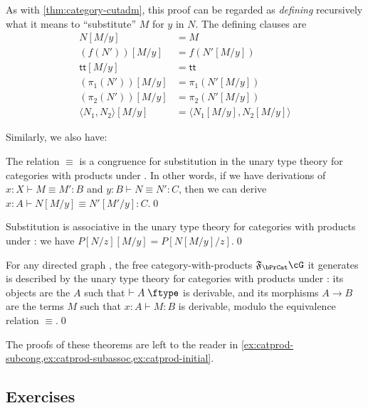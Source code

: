\documentclass{book}
\let\types\vdash
\def\type{\;\ftype}
\newcommand{\F}[1]{\mathfrak{F}_{#1}}
\def\ttt{\mathsf{tt}}
\def\pair#1#2{\langle #1,#2\rangle}
\begin{document}
As with \cref{thm:category-cutadm}, this proof can be regarded as \emph{defining} recursively what it means to ``substitute'' $M$ for $y$ in $N$.
The defining clauses are
\begin{align*}
  N[M/y] &= M\\
  (f(N'))[M/y] &= f(N'[M/y])\\
  \ttt[M/y] &= \ttt\\
  (\pi_1(N'))[M/y] &= \pi_1(N'[M/y])\\
  (\pi_2(N'))[M/y] &= \pi_2(N'[M/y])\\
  \pair{N_1}{N_2}[M/y] &= \pair{N_1[M/y]}{N_2[M/y]}
\end{align*}

Similarly, we also have:

\begin{thm}\label{thm:catprod-subcong}
  The relation $\equiv$ is a congruence for substitution in the unary type theory for categories with products under \cG.
  In other words, if we have derivations of $x:X \types M\equiv M':B$ and $y:B \types N\equiv N':C$, then we can derive $x:A \types N[M/y] \equiv N'[M'/y]:C$.\qed
\end{thm}

\begin{thm}\label{thm:catprod-subassoc}
  Substitution is associative in the unary type theory for categories with products under \cG: we have $P[N/z][M/y] = P[N[M/y]/z]$.\qed
\end{thm}

\begin{thm}\label{thm:catprod-initial}
  For any directed graph \cG, the free category-with-products $\F\bPrCat \cG$ it generates is described by the unary type theory for categories with products under \cG: its objects are the $A$ such that $\types A\type$ is derivable, and its morphisms $A\to B$ are the terms $M$ such that $x:A \types M:B$ is derivable, modulo the equivalence relation $\equiv$.\qed
\end{thm}

The proofs of these theorems are left to the reader in \cref{ex:catprod-subcong,ex:catprod-subassoc,ex:catprod-initial}.

\subsection*{Exercises}
\end{document}
